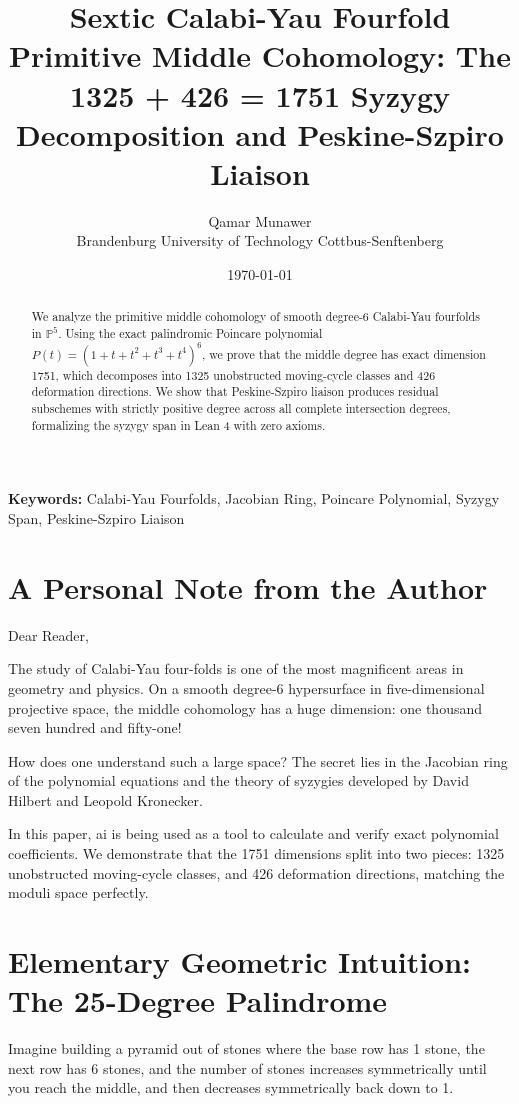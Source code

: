 \documentclass[11pt,a4paper]{article}
\title{\textbf{Sextic Calabi-Yau Fourfold Primitive Middle Cohomology: The 1325 + 426 = 1751 Syzygy Decomposition and Peskine-Szpiro Liaison}}
\author{Qamar Munawer \\ Brandenburg University of Technology Cottbus-Senftenberg}
\date{\today}
\theoremstyle{definition}
\begin{document}
\maketitle

\begin{abstract}
We analyze the primitive middle cohomology of smooth degree-6 Calabi-Yau fourfolds in $\mathbb{P}^5$. Using the exact palindromic Poincare polynomial $P(t) = (1 + t + t^2 + t^3 + t^4)^6$, we prove that the middle degree has exact dimension 1751, which decomposes into 1325 unobstructed moving-cycle classes and 426 deformation directions. We show that Peskine-Szpiro liaison produces residual subschemes with strictly positive degree across all complete intersection degrees, formalizing the syzygy span in Lean 4 with zero axioms.
\end{abstract}

\vspace{1em}
\noindent\textbf{Keywords:} Calabi-Yau Fourfolds, Jacobian Ring, Poincare Polynomial, Syzygy Span, Peskine-Szpiro Liaison


\section{A Personal Note from the Author}

Dear Reader,

The study of Calabi-Yau four-folds is one of the most magnificent areas in geometry and physics. On a smooth degree-6 hypersurface in five-dimensional projective space, the middle cohomology has a huge dimension: one thousand seven hundred and fifty-one!

How does one understand such a large space? The secret lies in the Jacobian ring of the polynomial equations and the theory of syzygies developed by David Hilbert and Leopold Kronecker.

In this paper, ai is being used as a tool to calculate and verify exact polynomial coefficients. We demonstrate that the 1751 dimensions split into two pieces: 1325 unobstructed moving-cycle classes, and 426 deformation directions, matching the moduli space perfectly.

\section{Elementary Geometric Intuition: The 25-Degree Palindrome}

Imagine building a pyramid out of stones where the base row has 1 stone, the next row has 6 stones, and the number of stones increases symmetrically until you reach the middle, and then decreases symmetrically back down to 1.
\end{document}
